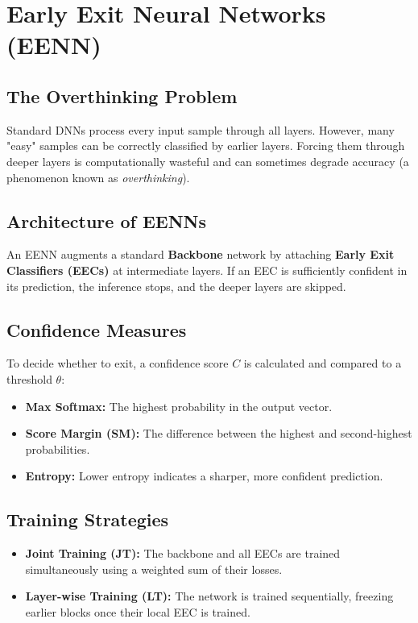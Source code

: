 \section{Early Exit Neural Networks (EENN)}

\subsection{The Overthinking Problem}
Standard DNNs process every input sample through all layers. However, many "easy" samples can be correctly classified by earlier layers. Forcing them through deeper layers is computationally wasteful and can sometimes degrade accuracy (a phenomenon known as \textit{overthinking}).

\subsection{Architecture of EENNs}
An EENN augments a standard \textbf{Backbone} network by attaching \textbf{Early Exit Classifiers (EECs)} at intermediate layers. If an EEC is sufficiently confident in its prediction, the inference stops, and the deeper layers are skipped.

\subsection{Confidence Measures}
To decide whether to exit, a confidence score $C$ is calculated and compared to a threshold $\theta$:
\begin{itemize}
    \item \textbf{Max Softmax:} The highest probability in the output vector.
    \item \textbf{Score Margin (SM):} The difference between the highest and second-highest probabilities.
    \item \textbf{Entropy:} Lower entropy indicates a sharper, more confident prediction.
\end{itemize}

\subsection{Training Strategies}
\begin{itemize}
    \item \textbf{Joint Training (JT):} The backbone and all EECs are trained simultaneously using a weighted sum of their losses.
    \item \textbf{Layer-wise Training (LT):} The network is trained sequentially, freezing earlier blocks once their local EEC is trained.
\end{itemize}

